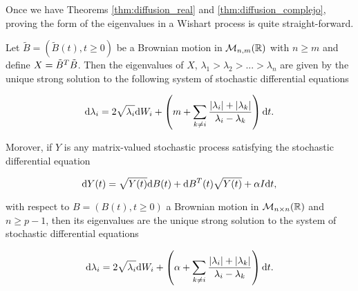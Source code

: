 Once we have Theorems \ref{thm:diffusion_real} and \ref{thm:diffusion_complejo}, proving the form of the eigenvalues in a Wishart process is quite straight-forward.



\begin{corollary}
    Let $\tilde B = (\tilde B(t), t\ge 0)$ be a Brownian motion in $\mathcal M_{n,m}(\mathbb R)$ with $n\ge m$ and define $X = \tilde B^T\tilde B$. Then the eigenvalues of $X$, $\lambda_1 > \lambda_2 > ... > \lambda_n$ are given by the unique strong solution to the following system of stochastic differential equations

    \begin{equation*}
        \mathrm d \lambda_i = 2 \sqrt{\lambda_i} \mathrm d W_i + \left(m + \sum_{k\neq i} \frac{\lvert \lambda_i \rvert + \lvert \lambda_k \rvert}{ \lambda_i - \lambda_k} \right) \mathrm d t.
    \end{equation*}

    Morover, if $Y$ is any matrix-valued stochastic process satisfying the stochastic differential equation

    \begin{equation*}
        \mathrm d Y(t) = \sqrt{Y(t)} \mathrm d B(t) + \mathrm d B^T(t) \sqrt{Y(t)} + \alpha I \mathrm d t,
    \end{equation*}

    with respect to $B = (B(t), t \ge 0)$ a Brownian motion in $\mathcal M_{n\times n}(\mathbb R)$ and $n\ge p-1$, then its eigenvalues are the unique strong solution to the system of stochastic differential equations

    \begin{equation} \label{eq:wishart}
        \mathrm d \lambda_i = 2 \sqrt{\lambda_i} \mathrm d W_i + \left(\alpha + \sum_{k\neq i} \frac{\lvert \lambda_i \rvert + \lvert \lambda_k \rvert}{ \lambda_i - \lambda_k} \right) \mathrm d t.
    \end{equation}

\end{corollary}

